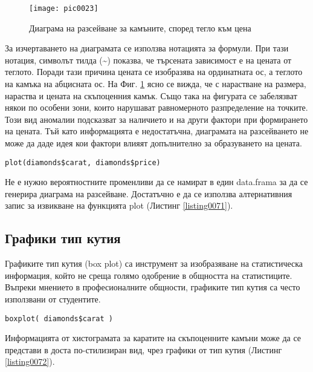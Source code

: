 \begin{figure}[h!]
  \centering
  \texttt{[image: pic0023]}
  \caption{Диаграма на разсейване за камъните, според тегло към цена}
\label{figure0023}
\end{figure}
\FloatBarrier

За изчертаването на диаграмата се използва нотацията за формули. При тази нотация, символът тилда (\textasciitilde) показва, че търсената зависимост е на цената от теглото. Поради тази причина цената се изобразява на ординатната ос, а теглото на камъка на абцисната ос. На Фиг. \ref{figure0023} ясно се вижда, че с нарастване на размера, нараства и цената на скъпоценния камък. Също така на фигурата се забелязват някои по особени зони, които нарушават равномерното разпределение на точките. Този вид аномалии подсказват за наличието и на други фактори при формирането на цената. Тъй като информацията е недостатъчна, диаграмата на разсейването не може да даде идея кои фактори влияят допълнително за образуването на цената. 

\begin{lstlisting}[caption=Алтернативна команда за диаграма на разсейване, label=listing0071]
plot(diamonds$carat, diamonds$price)
\end{lstlisting}

Не е нужно вероятностните променливи да се намират в един data.frama за да се генерира диаграма на разсейване. Достатъчно е да се използва алтернативния запис за извикване на функцията plot (Листинг \ref{listing0071}).

\subsection{Графики тип кутия}

Графиките тип кутия (box plot) са инструмент за изобразяване на статистическа информация, който не среща голямо одобрение в общността на статистиците. Въпреки мнението в професионалните общности, графиките тип кутия са често използвани от студентите. 

\begin{lstlisting}[caption=Генериране на графика от тип кутия, label=listing0072]
boxplot( diamonds$carat )
\end{lstlisting}

Информацията от хистограмата за каратите на скъпоценните камъни може да се представи в доста по-стилизиран вид, чрез графики от тип кутия (Листинг \ref{listing0072}). 

